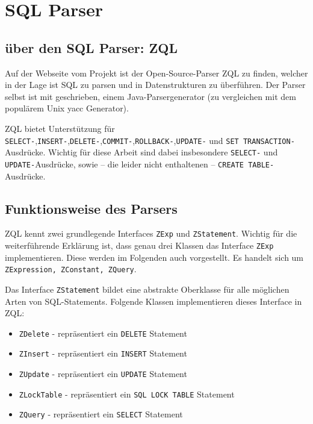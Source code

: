 \section{SQL Parser}

\subsection{über den SQL Parser: ZQL}

Auf der Webseite vom \cite{zql1} Projekt ist der Open-Source-Parser ZQL zu finden, welcher in der Lage ist SQL zu parsen und in Datenstrukturen zu überführen. Der Parser selbst ist mit \cite{javacc1} geschrieben, einem  Java-Parsergenerator (zu vergleichen mit dem populärem Unix yacc Generator).

ZQL bietet Unterstützung für \verb|SELECT-|,\verb|INSERT-|,\verb|DELETE-|,\verb|COMMIT-|,\verb|ROLLBACK-|,\verb|UPDATE-| und \verb|SET TRANSACTION-|Ausdrücke. Wichtig für diese Arbeit sind dabei insbesondere \verb|SELECT-| und \verb|UPDATE-|Ausdrücke, sowie -- die leider nicht enthaltenen -- \verb|CREATE TABLE-|Ausdrücke.

\subsection{Funktionsweise des Parsers}

ZQL kennt zwei grundlegende Interfaces \verb|ZExp| und \verb|ZStatement|. Wichtig für die weiterführende Erklärung ist, dass genau drei Klassen das Interface \verb|ZExp| implementieren. Diese werden im Folgenden auch vorgestellt. Es handelt sich um \verb|ZExpression, ZConstant, ZQuery|.

Das Interface \verb|ZStatement| bildet eine abstrakte Oberklasse für alle möglichen Arten von SQL-Statements. Folgende Klassen implementieren dieses Interface in ZQL:

\begin{itemize}
\item \verb|ZDelete| - repräsentiert ein \verb|DELETE| Statement
\item \verb|ZInsert| - repräsentiert ein \verb|INSERT| Statement
\item \verb|ZUpdate| - repräsentiert ein \verb|UPDATE| Statement
\item \verb|ZLockTable| - repräsentiert ein \verb|SQL LOCK TABLE| Statement
\item \verb|ZQuery| - repräsentiert ein \verb|SELECT| Statement
\end{itemize}

